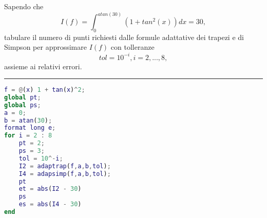 Sapendo che $$I(f) = \int_{0}^{atan(30)} (1+tan^{2}(x))dx = 30, $$ tabulare il numero di punti richiesti dalle formule adattative dei trapezi e di Simpson per approssimare $I(f)$ con tolleranze $$ tol = 10^{-i}, i = 2,...,8,$$ assieme ai relativi errori.

\hspace*{\fill}
\par\noindent\rule{\textwidth}{0.4pt}
\hspace*{\fill}

\begin{lstlisting}[language=Matlab, caption=Codice Matlab]
f = @(x) 1 + tan(x)^2;
global pt;
global ps;
a = 0;
b = atan(30);
format long e;
for i = 2 : 8
    pt = 2;
    ps = 3;
    tol = 10^-i;
    I2 = adaptrap(f,a,b,tol);
    I4 = adapsimp(f,a,b,tol);
    pt
    et = abs(I2 - 30)
    ps
    es = abs(I4 - 30)
end
\end{lstlisting}

\begin{table}[H]
    \caption{Risultati}
    \centering
\end{table}
